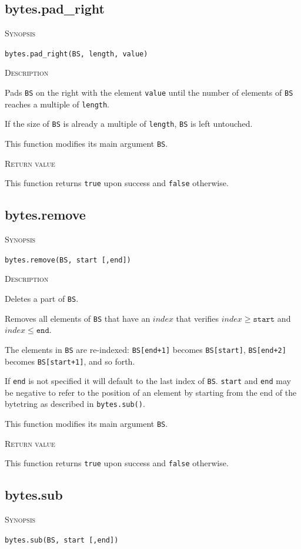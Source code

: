 \documentclass[11pt]{report}
\newcommand{\mansection}[1]{\vspace{0.5em}\par\noindent\textsc{#1}\vspace{0.5em}\par}
\newcommand{\syn}[1]{\texttt{#1}}
\begin{document}
\subsection{bytes.pad\_right}

\mansection{Synopsis}
\syn{bytes.pad\_right(BS, length, value)}

\mansection{Description}
  Pads \syn{BS} on the right with the element \syn{value} until the number of elements 
  of \syn{BS} reaches a multiple of \syn{length}.

  If the size of \syn{BS} is already a multiple of \syn{length}, \syn{BS} is left untouched.

  This function modifies its main argument \syn{BS}.
  
\mansection{Return value}
  This function returns \syn{true} upon success and \syn{false} otherwise.


\subsection{bytes.remove}

\mansection{Synopsis}
\syn{bytes.remove(BS, start [,end])}

\mansection{Description}
  Deletes a part of \syn{BS}.

  Removes all elements of \syn{BS} that have an $index$ that verifies 
  $index \geq \syn{start}$ and $index \leq \syn{end}$.

  The elements in \syn{BS} are re-indexed: \syn{BS[end+1]} becomes \syn{BS[start]},
  \syn{BS[end+2]} becomes \syn{BS[start+1]}, and so forth.

  If \syn{end} is not specified it will default to the last index of \syn{BS}.
  \syn{start} and \syn{end} may be negative to refer to the position of an element by 
  starting from the end of the bytetring as described in \syn{bytes.sub()}.

  This function modifies its main argument \syn{BS}.
  
\mansection{Return value}
  This function returns \syn{true} upon success and \syn{false} otherwise.


\subsection{bytes.sub}

\mansection{Synopsis}
\syn{bytes.sub(BS, start [,end])}
\end{document}
